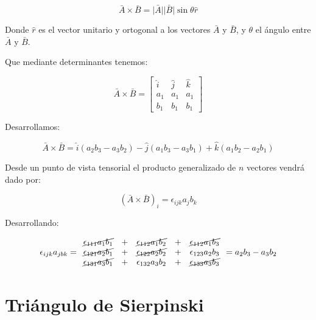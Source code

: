 \documentclass{article}
\providecommand{\abs}[1]{\lvert#1\rvert}
\begin{document}
\begin{equation}
    \bar{A} \times \bar{B}= \bar{\abs{A}} \bar{\abs{B}} \sin \theta \hat{r}
\end{equation}

Donde $\hat{r}$ es el vector unitario y ortogonal a los vectores $\bar{A}$ y
$\bar{B}$, y $\theta$ el ángulo entre $\bar{A}$ y $\bar{B}$.

Que mediante determinantes tenemos:

\begin{equation}
    \bar{A} \times \bar{B}=
    \begin{bmatrix}
        \hat{i} & \hat{j} & \hat{k}\\ 
         a_1 & a_1 & a_1\\ 
         b_1 & b_1 & b_1
    \end{bmatrix}
\end{equation}

Desarrollamos:

\begin{equation}
    \bar{A} \times \bar{B}= \hat{i}(a_2 b_3 - a_3 b_2) - \hat{j}(a_1 b_3 - a_3 b_1) + \hat{k}(a_1 b_2 - a_2 b_1)
\end{equation}

Desde un punto de vista tensorial el producto generalizado de $n$ vectores vendrá
dado por:

\begin{equation}
    (\bar{A} \times \bar{B})_{i} = \epsilon_{ijk} a_{j} b_{k}
\end{equation}

Desarrollando:

\begin{equation}
    \epsilon_{ijk} a_{jbk} =
    \begin{array}{ccccc}
        \cancel{\epsilon_{111} a_1 b_1} & + & \cancel{\epsilon_{112} a_1 b_2}   & + & \cancel{\epsilon_{112} a_1 b_3}   \\
        \cancel{\epsilon_{121} a_2 b_1} & + & \cancel{\epsilon_{122} a_2 b_2}   & + & \epsilon_{123} a_2 b_3            \\
        \cancel{\epsilon_{131} a_3 b_1} & + & \epsilon_{132} a_3 b_2            & + & \cancel{\epsilon_{133} a_3 b_3}
    \end{array}
    = a_2 b_3 - a_3 b_2
\end{equation}

\section{Tri\'angulo de Sierpinski}
\end{document}
